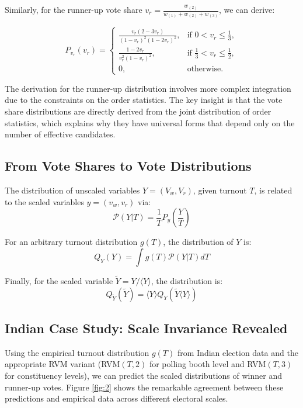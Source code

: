 Similarly, for the runner-up vote share $v_r = \frac{w_{(2)}}{w_{(1)} + w_{(2)} + w_{(3)}}$, we can derive:

\begin{equation}
P_{v_r}(v_r) = 
\begin{cases}
    \frac{v_r(2-3v_r)}{(1-v_r)^2(1-2v_r)^2}, & \text{if } 0 < v_r \leq \frac{1}{3},\\
    \frac{1-2v_r}{v_r^2(1-v_r)^2}, & \text{if } \frac{1}{3} < v_r \leq \frac{1}{2},\\
     0, & \text{otherwise}.
\end{cases}
\end{equation}

The derivation for the runner-up distribution involves more complex integration due to the constraints on the order statistics. The key insight is that the vote share distributions are directly derived from the joint distribution of order statistics, which explains why they have universal forms that depend only on the number of effective candidates.

\subsection{From Vote Shares to Vote Distributions}

The distribution of unscaled variables $Y = (V_w, V_r)$, given turnout $T$, is related to the scaled variables $y = (v_w, v_r)$ via:
\begin{equation}
    \mathcal{P}(Y|T) = \frac{1}{T}P_y\left(\frac{Y}{T}\right)
\end{equation}

For an arbitrary turnout distribution $g(T)$, the distribution of $Y$ is:
\begin{equation}
    Q_Y(Y) = \int g(T)\mathcal{P}(Y|T)dT
\end{equation}

Finally, for the scaled variable $\widetilde{Y} = Y/\langle Y \rangle$, the distribution is:
\begin{equation}
    Q_{\widetilde{Y}}(\widetilde{Y}) = \langle Y \rangle Q_Y(\widetilde{Y}\langle Y \rangle)
\end{equation}

\subsection{Indian Case Study: Scale Invariance Revealed}

Using the empirical turnout distribution $g(T)$ from Indian election data and the appropriate RVM variant (RVM$(T,2)$ for polling booth level and RVM$(T,3)$ for constituency levels), we can predict the scaled distributions of winner and runner-up votes. Figure \ref{fig:2} shows the remarkable agreement between these predictions and empirical data across different electoral scales.

